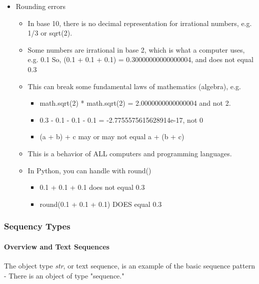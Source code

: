 \documentclass[11pt]{article}
\providecommand{\tightlist}{%
      \setlength{\itemsep}{0pt}\setlength{\parskip}{0pt}}
\begin{document}
\begin{itemize}
\tightlist
\item
  Rounding errors

  \begin{itemize}
  \tightlist
  \item
    In base 10, there is no decimal representation for irrational
    numbers, e.g. 1/3 or sqrt(2).
  \item
    Some numbers are irrational in base 2, which is what a computer
    uses, e.g. 0.1 So, (0.1 + 0.1 + 0.1) = 0.30000000000000004, and does
    not equal 0.3
  \item
    This can break some fundamental laws of mathematics (algebra), e.g.

    \begin{itemize}
    \tightlist
    \item
      math.sqrt(2) * math.sqrt(2) = 2.0000000000000004 and not 2.
    \item
      0.3 - 0.1 - 0.1 - 0.1 = -2.7755575615628914e-17, not 0
    \item
      (a + b) + c may or may not equal a + (b + c)
    \end{itemize}
  \item
    This is a behavior of ALL computers and programming languages.
  \item
    In Python, you can handle with round()

    \begin{itemize}
    \tightlist
    \item
      0.1 + 0.1 + 0.1 does not equal 0.3
    \item
      round(0.1 + 0.1 + 0.1) DOES equal 0.3
    \end{itemize}
  \end{itemize}
\end{itemize}

    \subsubsection{Sequency Types}\label{sequency-types}

\paragraph{Overview and Text
Sequences}\label{overview-and-text-sequences}

The object type \emph{str}, or text sequence, is an example of the basic
sequence pattern - There is an object of type "sequence."
\end{document}
